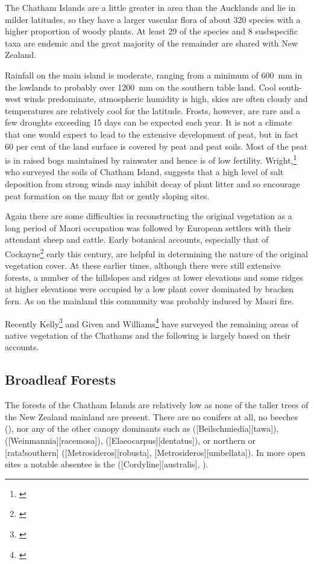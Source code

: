 The Chatham Islands are a little greater in area than the Aucklands and lie in milder latitudes, so they have a larger vascular flora of about 320 species with a higher proportion of woody plants.
At least 29 of the species and 8 susbspecific taxa are endemic and the great majority of the remainder are shared with New Zealand.

Rainfall on the main island is moderate, ranging from a minimum of \SI{600}{\milli\metre} in the lowlands to probably over \SI{1200}{\milli\metre} on the southern table land.
Cool south-west winds predominate, atmospheric humidity is high, skies are often cloudy and temperatures are relatively cool for the latitude.
Frosts, however, are rare and a few droughts exceeding 15 days can be expected each year.
It is not a climate that one would expect to lead to the extensive development of peat, but in fact 60 per cent of the land surface is covered by peat and peat soils.
Most of the peat is in raised bogs maintained by rainwater and hence is of low fertility.
Wright,\footnote{\cite{wright1959soils}} who surveyed the soils of Chatham Island, suggests that a high level of salt deposition from strong winds may inhibit decay of plant litter and so encourage peat formation on the many flat or gently sloping sites.

Again there are some difficulties in reconstructing the original vegetation as a long period of Maori occupation was followed by European settlers with their attendant sheep and cattle.
Early botanical accounts, especially that of Cockayne\footnote{\cite{cockayne1902chatham}} early this century, are helpful in determining the nature of the original vegetation cover.
At these earlier times, although there were still extensive forests, a number of the hillslopes and ridges at lower elevations and some ridges at higher elevations were occupied by a low plant cover dominated by bracken fern.
As on the mainland this community was probably induced by Maori fire.

Recently Kelly\footnote{\cite{kelly1983distribution}} and Given and Williams\footnote{\cite{given1984conservation}} have surveyed the remaining areas of native vegetation of the Chathams and the following is largely based on their accounts.

\subsection{Broadleaf Forests}

The forests of the Chatham Islands are relatively low as none of the taller trees of the New Zealand mainland are present.
There are no conifers at all, no beeches (), nor any of the other canopy dominants such as  ([Beilschmiedia][tawa]),  ([Weinmannia][racemosa]),  ([Elaeocarpus][dentatus]), or northern or [rata!southern] ([Metrosideros][robusta], [Metrosideros][umbellata]).
In more open sites a notable absentee is the  ([Cordyline][australis], ).

